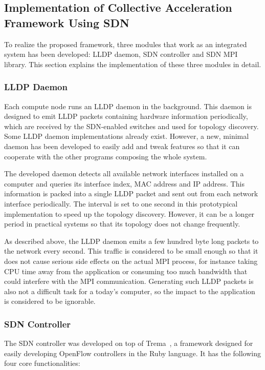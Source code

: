 \subsection{Implementation of Collective Acceleration Framework Using SDN}

To realize the proposed framework, three modules that work as an integrated
system has been developed: LLDP daemon, SDN controller and SDN MPI library.
This section explains the implementation of these three modules in detail.

\subsubsection{LLDP Daemon}

Each compute node runs an LLDP daemon in the background. This daemon is
designed to emit LLDP packets containing hardware information periodically,
which are received by the SDN-enabled switches and used for topology
discovery. Some LLDP daemon implementations already exist. However, a new,
minimal daemon has been developed to easily add and tweak features so that it
can cooperate with the other programs composing the whole system.

The developed daemon detects all available network interfaces installed on a
computer and queries its interface index, MAC address and IP address.
This information is packed into a single LLDP packet and sent out from
each network interface periodically. The interval is set to one second in
this prototypical implementation to speed up the topology discovery.
However, it can be a longer period in practical systems so that its
topology does not change frequently.

As described above, the LLDP daemon emits a few hundred byte long packets to
the network every second. This traffic is considered to be small enough so
that it does not cause serious side effects on the actual MPI process, for
instance taking CPU time away from the application or consuming too much
bandwidth that could interfere with the MPI communication. Generating such
LLDP packets is also not a difficult task for a today's  computer, so the
impact to the application is considered to be ignorable.

\subsubsection{SDN Controller}

The SDN controller was developed on top  of Trema~\autocite{trema}, a
framework designed for easily developing OpenFlow controllers in the Ruby
language. It has the following four core functionalities:

